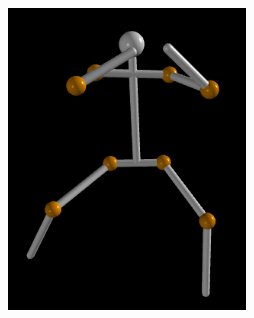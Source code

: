 \documentclass[final]{article}
\begin{document}
\begin{spacing}{1.1}
\begin{center}
  \includegraphics[height=8cm]{fig/mykillbillrecons2.png}
\end{center}


\end{spacing}
\end{document}
